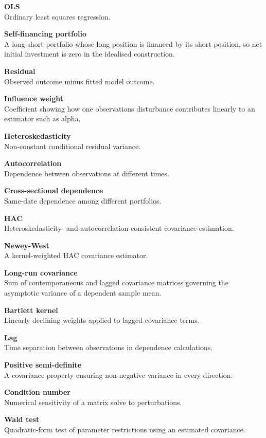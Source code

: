 \textbf{OLS}\\
Ordinary least squares regression.

\textbf{Self-financing portfolio}\\
A long-short portfolio whose long position is financed by its short
position, so net initial investment is zero in the idealised
construction.

\textbf{Residual}\\
Observed outcome minus fitted model outcome.

\textbf{Influence weight}\\
Coefficient showing how one observation\textquotesingle s disturbance
contributes linearly to an estimator such as alpha.

\textbf{Heteroskedasticity}\\
Non-constant conditional residual variance.

\textbf{Autocorrelation}\\
Dependence between observations at different times.

\textbf{Cross-sectional dependence}\\
Same-date dependence among different portfolios.

\textbf{HAC}\\
Heteroskedasticity- and autocorrelation-consistent covariance
estimation.

\textbf{Newey-West}\\
A kernel-weighted HAC covariance estimator.

\textbf{Long-run covariance}\\
Sum of contemporaneous and lagged covariance matrices governing the
asymptotic variance of a dependent sample mean.

\textbf{Bartlett kernel}\\
Linearly declining weights applied to lagged covariance terms.

\textbf{Lag}\\
Time separation between observations in dependence calculations.

\textbf{Positive semi-definite}\\
A covariance property ensuring non-negative variance in every direction.

\textbf{Condition number}\\
Numerical sensitivity of a matrix solve to perturbations.

\textbf{Wald test}\\
Quadratic-form test of parameter restrictions using an estimated
covariance.

